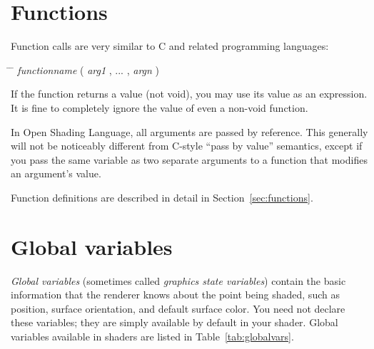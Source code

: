 \documentclass[11pt,letterpaper]{book}
\def\langname{Open Shading Language\xspace}
\def\void{{\cf void}\xspace}
\begin{document}
\section{Functions}
\label{sec:syntax:functions}

Function calls are very similar to C and related programming languages:

\begin{tabbing}
\hspace{0.5in} \= \hspace{0.3in} \= \kill
\> \emph{functionname} {\cf (} \emph{arg1} {\cf ,} ... {\cf ,} \emph{argn} {\cf )} \\
\end{tabbing}

If the function returns a value (not \void), you may use its value as
an expression.  It is fine to completely ignore the value of even
a non-\void function.

In \langname, all arguments are passed by reference.  This generally
will not be noticeably different from C-style ``pass by value''
semantics, except if you pass the same variable as two separate
arguments to a function that modifies an argument's value.

Function definitions are described in detail in Section~\ref{sec:functions}.

\section{Global variables}
\label{sec:globalvars}

\emph{Global variables} (sometimes called \emph{graphics state
variables}) contain the basic information that the renderer knows
about the point being shaded, such as position, surface orientation, and
default surface color.  You need not declare these variables; they are
simply available by default in your shader.  Global variables available
in shaders are listed in Table~\ref{tab:globalvars}.
\end{document}
